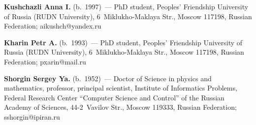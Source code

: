   \vspace*{3pt}
  
  \noindent
  \textbf{Kushchazli Anna I.} (b.\ 1997)~--- PhD student, Peoples' Friendship University of 
Russia (RUDN University), 6~Miklukho-Maklaya Str., Moscow 117198, Russian Federation; 
\mbox{aikushch@yandex.ru}
  
  
  \vspace*{3pt}
  
  \noindent
  \textbf{Kharin Petr A.} (b.\ 1993)~--- PhD student, Peoples' Friendship University of Russia 
(RUDN University), 6~Miklukho-Maklaya Str., Moscow 117198, Russian Federation; 
\mbox{pxarin@mail.ru}
  
  \vspace*{3pt}
  
  \noindent
  \textbf{Shorgin Sergey Ya.} (b.\ 1952)~--- Doctor of Science in physics and mathematics, 
professor, principal scientist, Institute of Informatics Problems, Federal Research Center 
``Computer Science and Control'' of the Russian Academy of Sciences, 44-2~Vavilov Str., Moscow 
119333, Russian Federation; \mbox{sshorgin@ipiran.ru}


\label{end\stat}

\renewcommand{\bibname}{\protect\rm Литература} 